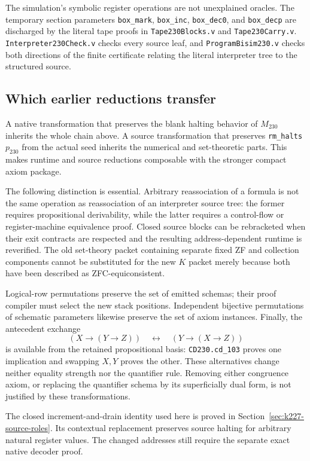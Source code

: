 The simulation's symbolic register operations are not unexplained oracles.
The temporary section parameters \texttt{box\_mark}, \texttt{box\_inc},
\texttt{box\_dec0}, and \texttt{box\_decp} are discharged by the literal
tape proofs in \texttt{Tape230Blocks.v} and \texttt{Tape230Carry.v}.
\texttt{Interpreter230Check.v} checks every source leaf, and
\texttt{ProgramBisim230.v} checks both directions of the finite certificate
relating the literal interpreter tree to the structured source.

\subsection{Which earlier reductions transfer}

A native transformation that preserves the blank halting behavior of
\(M_{230}\) inherits the whole chain above. A source transformation that
preserves \texttt{rm\_halts}\,\(p_{230}\) from the actual seed inherits
the numerical and set-theoretic parts. This makes runtime and source
reductions composable with the stronger compact axiom package.

The following distinction is essential. Arbitrary reassociation of a
formula is not the same operation as reassociation of an interpreter
source tree: the former requires propositional derivability, while the
latter requires a control-flow or register-machine equivalence proof.
Closed source blocks can be rebracketed when their exit contracts are
respected and the resulting address-dependent runtime is reverified.
The old set-theory packet containing separate fixed ZF and collection
components cannot be substituted for the new \(K\) packet merely because
both have been described as ZFC-equiconsistent.

Logical-row permutations preserve the set of emitted schemas; their proof
compiler must select the new stack positions. Independent bijective
permutations of schematic parameters likewise preserve the set of axiom
instances. Finally, the antecedent exchange
\[
 (X\to(Y\to Z))\quad\longleftrightarrow\quad(Y\to(X\to Z))
\]
is available from the retained propositional basis:
\texttt{CD230.cd\_103} proves one implication and swapping \(X,Y\)
proves the other. These alternatives change neither equality strength nor
the quantifier rule. Removing either congruence axiom, or replacing the
quantifier schema by its superficially dual form, is not justified by
these transformations.

The closed increment-and-drain identity used here is proved in
Section~\ref{sec:k227-source-roles}. Its contextual replacement preserves
source halting for arbitrary natural register values. The changed addresses
still require the separate exact native decoder proof.

